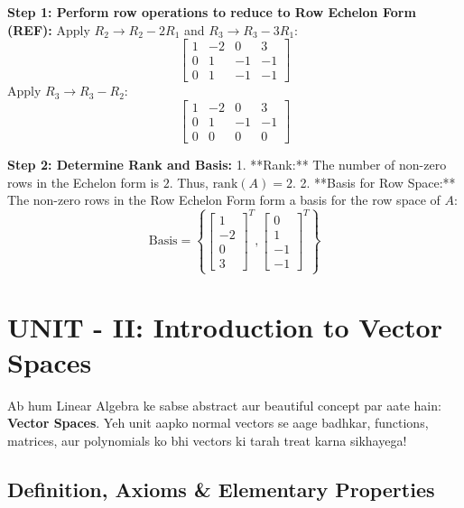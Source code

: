 \documentclass[11pt,a4paper]{article}
\begin{document}
\begin{solutionbox}
\textbf{Step 1: Perform row operations to reduce to Row Echelon Form (REF):}
Apply $R_2 \to R_2 - 2R_1$ and $R_3 \to R_3 - 3R_1$:
\[ \begin{bmatrix} 1 & -2 & 0 & 3 \\ 0 & 1 & -1 & -1 \\ 0 & 1 & -1 & -1 \end{bmatrix} \]
Apply $R_3 \to R_3 - R_2$:
\[ \begin{bmatrix} 1 & -2 & 0 & 3 \\ 0 & 1 & -1 & -1 \\ 0 & 0 & 0 & 0 \end{bmatrix} \]

\textbf{Step 2: Determine Rank and Basis:}
1. **Rank:** The number of non-zero rows in the Echelon form is $2$. Thus, $\text{rank}(A) = 2$.
2. **Basis for Row Space:** The non-zero rows in the Row Echelon Form form a basis for the row space of $A$:
   \[ \text{Basis} = \left\{ \begin{bmatrix} 1 \\ -2 \\ 0 \\ 3 \end{bmatrix}^T, \begin{bmatrix} 0 \\ 1 \\ -1 \\ -1 \end{bmatrix}^T \right\} \]
\end{solutionbox}

\newpage

\section{UNIT - II: Introduction to Vector Spaces}

Ab hum Linear Algebra ke sabse abstract aur beautiful concept par aate hain: \textbf{Vector Spaces}. Yeh unit aapko normal vectors se aage badhkar, functions, matrices, aur polynomials ko bhi vectors ki tarah treat karna sikhayega!

\subsection{Definition, Axioms \& Elementary Properties}
\end{document}
